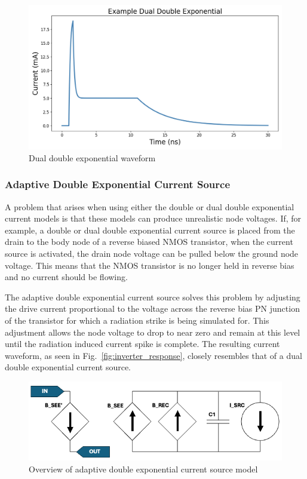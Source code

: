 \documentclass[conference]{IEEEtran}
\begin{document}
    \begin{figure}[htbp]
        \centering
        \includegraphics[width=0.95\linewidth]{EX_Dual_Double_Exponential}
        \caption{Dual double exponential waveform}
        \label{fig:dual_double_exp}
    \end{figure}

    \subsubsection{Adaptive Double Exponential Current Source}
    A problem that arises when using either the double or dual double exponential current models is that these models can produce unrealistic node voltages.
    If, for example, a double or dual double exponential current source is placed from the drain to the body node of a reverse biased NMOS transistor, when the current source is activated, the drain node voltage can be pulled below the ground node voltage.
    This means that the NMOS transistor is no longer held in reverse bias and no current should be flowing.

    The adaptive double exponential current source solves this problem by adjusting the drive current proportional to the voltage across the reverse bias PN junction of the transistor for which a radiation strike is being simulated for.
    This adjustment allows the node voltage to drop to near zero and remain at this level until the radiation induced current spike is complete.
    The resulting current waveform, as seen in Fig.~\ref{fig:inverter_response}, closely resembles that of a dual double exponential current source.

    \begin{figure}[htbp]
        \centering
        \includegraphics[width=0.95\linewidth]{Adaptive_Model_Cropped}
        \caption{Overview of adaptive double exponential current source model \cite{Kauppila2009}}
        \label{fig:adaptive_model_overview}
    \end{figure}
\end{document}
